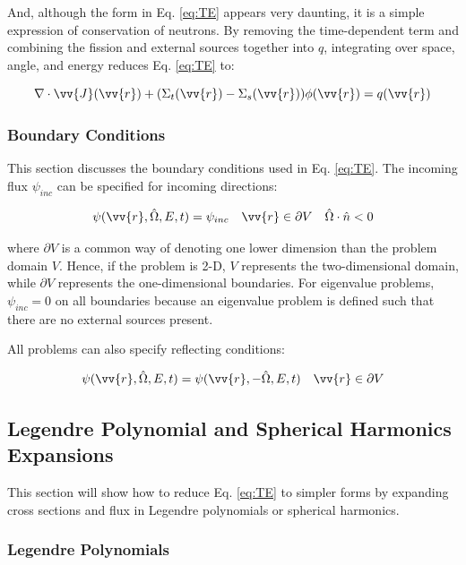 \documentclass[10pt]{article}
\begin{document}
\begin{flushleft}
And, although the form in Eq. \eqref{eq:TE} appears very daunting, it is a simple expression of conservation of neutrons. By removing the time-dependent term and combining the fission and external sources together into \(q\), integrating over space, angle, and energy reduces Eq. \eqref{eq:TE} to:

\begin{equation}
\nabla\cdot\vv{J}(\vv{r})+(\Sigma_t(\vv{r})-\Sigma_s(\vv{r}))\phi(\vv{r})=q(\vv{r})
\end{equation}

\subsubsection{Boundary Conditions}

This section discusses the boundary conditions used in Eq. \eqref{eq:TE}. The incoming flux \(\psi_{inc}\) can be specified for incoming directions:

\begin{equation}
\psi(\vv{r},\hat{\Omega},E,t)=\psi_{inc}\quad\vv{r}\in \partial V\quad\hat{\Omega}\cdot\hat{n}<0
\end{equation}

where \(\partial V\) is a common way of denoting one lower dimension than the problem domain \(V\). Hence, if the problem is 2-D, \(V\) represents the two-dimensional domain, while \(\partial V\) represents the one-dimensional boundaries. For eigenvalue problems, \(\psi_{inc}=0\) on all boundaries because an eigenvalue problem is defined such that there are no external sources present. 

All problems can also specify reflecting conditions:

\begin{equation}
\psi(\vv{r},\hat{\Omega},E,t)=\psi(\vv{r},-\hat{\Omega},E,t)\quad\vv{r}\in\partial V
\end{equation}

\subsection{Legendre Polynomial and Spherical Harmonics Expansions}
This section will show how to reduce Eq. \eqref{eq:TE} to simpler forms by expanding cross sections and flux in Legendre polynomials or spherical harmonics.

\subsubsection{Legendre Polynomials}


\end{flushleft}
\end{document}
